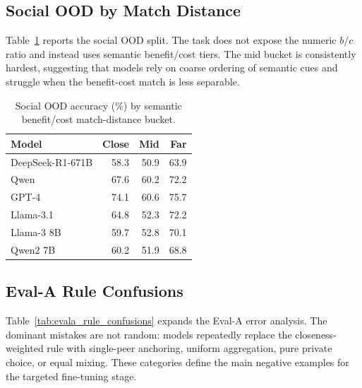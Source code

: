 \subsection{Social OOD by Match Distance}

Table~\ref{tab:social_distance} reports the social OOD split. The task does not
expose the numeric $b/c$ ratio and instead uses semantic benefit/cost tiers. The
mid bucket is consistently hardest, suggesting that models rely on coarse
ordering of semantic cues and struggle when the benefit-cost match is less
separable.

\begin{table}[h]
\centering
\small
\setlength{\tabcolsep}{6pt}
\begin{tabular}{@{}lrrr@{}}
\toprule
\textbf{Model} & \textbf{Close} & \textbf{Mid} & \textbf{Far} \\
\midrule
DeepSeek-R1-671B & 58.3 & 50.9 & 63.9 \\
Qwen & 67.6 & 60.2 & 72.2 \\
GPT-4 & 74.1 & 60.6 & 75.7 \\
Llama-3.1 & 64.8 & 52.3 & 72.2 \\
Llama-3 8B & 59.7 & 52.8 & 70.1 \\
Qwen2 7B & 60.2 & 51.9 & 68.8 \\
\bottomrule
\end{tabular}
\caption{Social OOD accuracy (\%) by semantic benefit/cost match-distance bucket.}
\label{tab:social_distance}
\end{table}

\subsection{Eval-A Rule Confusions}

Table~\ref{tab:evala_rule_confusions} expands the Eval-A error analysis. The
dominant mistakes are not random: models repeatedly replace the closeness-
weighted rule with single-peer anchoring, uniform aggregation, pure private
choice, or equal mixing. These categories define the main negative examples for
the targeted fine-tuning stage.

